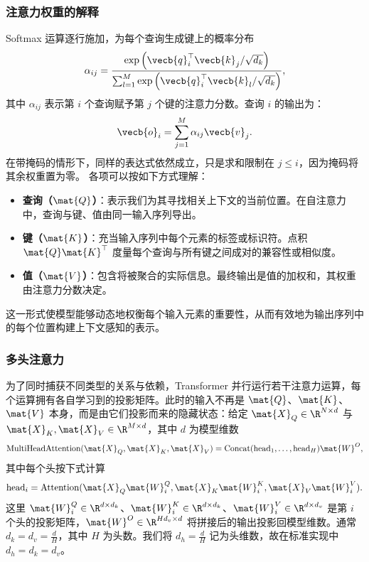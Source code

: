 \subsubsection{注意力权重的解释}

Softmax 运算逐行施加，为每个查询生成键上的概率分布
\begin{equation}
\label{eq:att-score}
\alpha_{ij} = \frac{\exp\left( \vecb{q}_i^\top \vecb{k}_j / \sqrt{d_k} \right)}{\sum_{l=1}^{M} \exp\left( \vecb{q}_i^\top \vecb{k}_l / \sqrt{d_k} \right)},
\end{equation}
其中 $\alpha_{ij}$ 表示第 $i$ 个查询赋予第 $j$ 个键的注意力分数。查询 $i$ 的输出为：
\begin{equation}
\vecb{o}_i = \sum_{j=1}^{M} \alpha_{ij} \vecb{v}_j.
\label{eq:context_vector}
\end{equation}
在带掩码的情形下，同样的表达式依然成立，只是求和限制在 $j \le i$，因为掩码将其余权重置为零。
各项可以按如下方式理解：
\begin{itemize}
    \item \textbf{查询（$\mat{Q}$）}：表示我们为其寻找相关上下文的当前位置。在自注意力中，查询与键、值由同一输入序列导出。
    \item \textbf{键（$\mat{K}$）}：充当输入序列中每个元素的标签或标识符。点积 $\mat{Q} \mat{K}^\top$ 度量每个查询与所有键之间成对的兼容性或相似度。
    \item \textbf{值（$\mat{V}$）}：包含将被聚合的实际信息。最终输出是值的加权和，其权重由注意力分数决定。
\end{itemize}
这一形式使模型能够动态地权衡每个输入元素的重要性，从而有效地为输出序列中的每个位置构建上下文感知的表示。


\subsubsection{多头注意力}

为了同时捕获不同类型的关系与依赖，Transformer 并行运行若干注意力运算，每个运算拥有各自学习到的投影矩阵。此时的输入不再是 $\mat{Q}$、$\mat{K}$、$\mat{V}$ 本身，而是由它们投影而来的隐藏状态：给定 $\mat{X}_Q \in \R^{N \times d}$ 与 $\mat{X}_K, \mat{X}_V \in \R^{M \times d}$，其中 $d$ 为模型维数
\begin{equation}
\text{MultiHeadAttention}(\mat{X}_Q, \mat{X}_K, \mat{X}_V) = \text{Concat}(\text{head}_1, \dots, \text{head}_H) \mat{W}^O,
\label{eq:multi_head}
\end{equation}
其中每个头按下式计算
\begin{equation}
\text{head}_i = \text{Attention}(\mat{X}_Q \mat{W}_i^Q, \mat{X}_K \mat{W}_i^K, \mat{X}_V \mat{W}_i^V).
\label{eq:head}
\end{equation}
这里 $\mat{W}_i^Q \in \R^{d \times d_k}$、$\mat{W}_i^K \in \R^{d \times d_k}$、$\mat{W}_i^V \in \R^{d \times d_v}$ 是第 $i$ 个头的投影矩阵，$\mat{W}^O \in \R^{H d_v \times d}$ 将拼接后的输出投影回模型维数。通常 $d_k = d_v = \frac{d}{H}$，其中 $H$ 为头数。我们将 $d_h = \frac{d}{H}$ 记为头维数，故在标准实现中 $d_h = d_k = d_v$。


